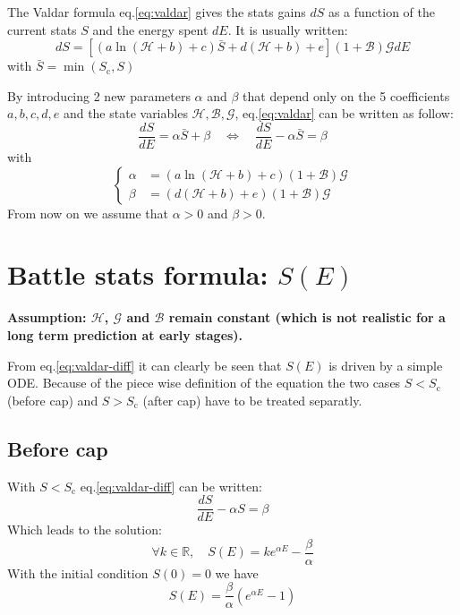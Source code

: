 \documentclass[12pt]{article}
\def\happy{\mathcal{H}}
\def\gym{\mathcal{G}}
\def\bonus{\mathcal{B}}
\def\Sc{S_\text{c}}
\begin{document}
The Valdar formula eq.\eqref{eq:valdar} gives the stats gains $dS$ as a function of the current stats $S$ and the energy spent $dE$. It is usually written:
\begin{equation}
    dS = \left[ (a\ln(\happy+b)+c) \bar{S} + d(\happy+b) + e \right](1+\bonus)\gym dE
    \label{eq:valdar}
\end{equation}
with $\bar{S} = \min(\Sc, S)$

\par By introducing 2 new parameters $\alpha$ and $\beta$ that depend only on the 5 coefficients $a, b, c, d, e$ and the state variables $\happy, \bonus, \gym$, eq.\eqref{eq:valdar} can be written as follow:
\begin{equation}
    \frac{dS}{dE} = \alpha \bar{S} + \beta \quad \Leftrightarrow \quad \frac{dS}{dE} - \alpha \bar{S} = \beta
    \label{eq:valdar-diff}
\end{equation}
with
\begin{equation}
    \left\{\begin{aligned}
        \alpha &= (a\ln(\happy+b)+c)(1+\bonus)\gym\\
        \beta &= (d(\happy+b) +e)(1+\bonus)\gym
    \end{aligned}\right.
\end{equation}
From now on we assume that $\alpha > 0$ and $\beta > 0$.

\section{Battle stats formula: $S(E)$}
\par {\color{myred}\bf Assumption: $\happy$, $\gym$ and $\bonus$ remain constant (which is not realistic for a long term prediction at early stages).}

\par From eq.\eqref{eq:valdar-diff} it can clearly be seen that $S(E)$ is driven by a simple ODE. Because of the piece wise definition of the equation the two cases $S<\Sc$ (before cap) and $S>\Sc$ (after cap) have to be treated separatly.

\subsection{Before cap}
With $S<\Sc$ eq.\eqref{eq:valdar-diff} can be written:
\begin{equation}
    \frac{dS}{dE} -\alpha S = \beta
\end{equation}
Which leads to the solution:
\begin{equation}
    \forall k \in \mathbb{R},\quad S(E) = ke^{\alpha E} - \frac{\beta}{\alpha}
    \label{eq:bs-bc-diff-k}
\end{equation}
With the initial condition $S(0)=0$ we have
\begin{equation}
    S(E) = \frac{\beta}{\alpha}\left(e^{\alpha E} - 1\right)
    \label{eq:bs-bc-diff}
\end{equation}
\end{document}
